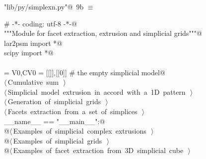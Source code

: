 \documentclass[11pt,oneside]{article}	%
\begin{document}
\begin{flushleft} \small
\begin{minipage}{\linewidth} \label{scrap10}
\protect{}\verb@"lib/py/simplexn.py"@\nobreak\ {\footnotesize 9b }$\equiv$
\vspace{-1ex}
\begin{list}{}{} \item
\mbox{}\verb@# -*- coding: utf-8 -*-@\\
\mbox{}\verb@"""Module for facet extraction, extrusion and simplicial grids"""@\\
\mbox{}\verb@from lar2psm import *@\\
\mbox{}\verb@from scipy import *@\\
\mbox{}\verb@@\\
\mbox{}\verb@VOID = V0,CV0 = [[]],[[0]]    # the empty simplicial model@\\
\mbox{}\verb@@\hbox{$\langle\,$Cumulative sum\nobreak\ {\footnotesize {}}$\,\rangle$}\verb@@\\
\mbox{}\verb@@\hbox{$\langle\,$Simplicial model extrusion in accord with a 1D pattern\nobreak\ {\footnotesize {}}$\,\rangle$}\verb@@\\
\mbox{}\verb@@\hbox{$\langle\,$Generation of simplicial grids\nobreak\ {\footnotesize {}}$\,\rangle$}\verb@@\\
\mbox{}\verb@@\hbox{$\langle\,$Facets extraction from a set of simplices\nobreak\ {\footnotesize {}}$\,\rangle$}\verb@@\\
\mbox{}\verb@if __name__ == "__main__":@\\
\mbox{}\verb@   @\hbox{$\langle\,$Examples of simplicial complex extrusions\nobreak\ {\footnotesize {}}$\,\rangle$}\verb@@\\
\mbox{}\verb@   @\hbox{$\langle\,$Examples of simplicial grids\nobreak\ {\footnotesize {}}$\,\rangle$}\verb@@\\
\mbox{}\verb@   @\hbox{$\langle\,$Examples of facet extraction from 3D simplicial cube\nobreak\ {\footnotesize {}}$\,\rangle$}\verb@@\\
\mbox{}\verb@@{\NWsep}
\end{list}
\vspace{-2ex}
\end{minipage}\\[4ex]
\end{flushleft}
\end{document}
